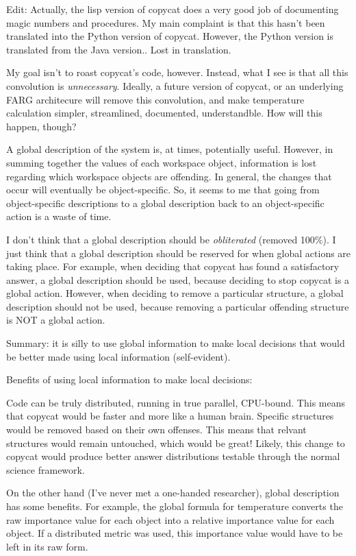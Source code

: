 \documentclass[a4paper]{article}
\begin{document}
    Edit: Actually, the lisp version of copycat does a very good job of documenting magic numbers and procedures.
    My main complaint is that this hasn't been translated into the Python version of copycat.
    However, the Python version is translated from the Java version..
    Lost in translation.


    My goal isn't to roast copycat's code, however.
    Instead, what I see is that all this convolution is \emph{unnecessary}.
    Ideally, a future version of copycat, or an underlying FARG architecure will remove this convolution, and make temperature calculation simpler, streamlined, documented, understandble.
    How will this happen, though?

    A global description of the system is, at times, potentially useful.
    However, in summing together the values of each workspace object, information is lost regarding which workspace objects are offending.
    In general, the changes that occur will eventually be object-specific.
    So, it seems to me that going from object-specific descriptions to a global description back to an object-specific action is a waste of time.

    I don't think that a global description should be \emph{obliterated} (removed 100\%).
    I just think that a global description should be reserved for when global actions are taking place.
    For example, when deciding that copycat has found a satisfactory answer, a global description should be used, because deciding to stop copycat is a global action.
    However, when deciding to remove a particular structure, a global description should not be used, because removing a particular offending structure is NOT a global action.

    Summary: it is silly to use global information to make local decisions that would be better made using local information (self-evident).

    Benefits of using local information to make local decisions:
    
    Code can be truly distributed, running in true parallel, CPU-bound.
    This means that copycat would be faster and more like a human brain.
    Specific structures would be removed based on their own offenses.
    This means that relvant structures would remain untouched, which would be great!
    Likely, this change to copycat would produce better answer distributions testable through the normal science framework.

    On the other hand (I've never met a one-handed researcher), global description has some benefits.
    For example, the global formula for temperature converts the raw importance value for each object into a relative importance value for each object.
    If a distributed metric was used, this importance value would have to be left in its raw form.
\end{document}
